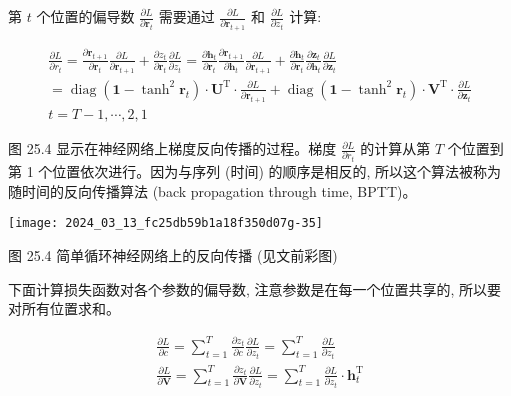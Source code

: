 \documentclass[10pt]{article}
\begin{document}
第 $t$ 个位置的偏导数 $\frac{\partial L}{\partial \boldsymbol{r}_{t}}$ 需要通过 $\frac{\partial L}{\partial \boldsymbol{r}_{t+1}}$ 和 $\frac{\partial L}{\partial z_{t}}$ 计算:


\begin{gather*}
\frac{\partial L}{\partial r_{t}}=\frac{\partial \boldsymbol{r}_{t+1}}{\partial \boldsymbol{r}_{t}} \frac{\partial L}{\partial \boldsymbol{r}_{t+1}}+\frac{\partial z_{t}}{\partial \boldsymbol{r}_{t}} \frac{\partial L}{\partial z_{t}}=\frac{\partial \boldsymbol{h}_{t}}{\partial \boldsymbol{r}_{t}} \frac{\partial \boldsymbol{r}_{t+1}}{\partial \boldsymbol{h}_{t}} \frac{\partial L}{\partial \boldsymbol{r}_{t+1}}+\frac{\partial \boldsymbol{h}_{t}}{\partial \boldsymbol{r}_{t}} \frac{\partial \boldsymbol{z}_{t}}{\partial \boldsymbol{h}_{t}} \frac{\partial L}{\partial \boldsymbol{z}_{t}} \\
=\operatorname{diag}\left(\boldsymbol{1}-\tanh ^{2} \boldsymbol{r}_{t}\right) \cdot \boldsymbol{U}^{\mathrm{T}} \cdot \frac{\partial L}{\partial \boldsymbol{r}_{t+1}}+\operatorname{diag}\left(\boldsymbol{1}-\tanh ^{2} \boldsymbol{r}_{t}\right) \cdot \boldsymbol{V}^{\mathrm{T}} \cdot \frac{\partial L}{\partial \boldsymbol{z}_{t}} \\
t=T-1, \cdots, 2,1 \tag{25.13}
\end{gather*}


图 25.4 显示在神经网络上梯度反向传播的过程。梯度 $\frac{\partial L}{\partial r_{t}}$ 的计算从第 $T$ 个位置到第 1 个位置依次进行。因为与序列 (时间) 的顺序是相反的, 所以这个算法被称为随时间的反向传播算法 (back propagation through time, BPTT)。

\begin{center}
\texttt{[image: 2024\_03\_13\_fc25db59b1a18f350d07g-35]}
\end{center}

图 25.4 简单循环神经网络上的反向传播 (见文前彩图)

下面计算损失函数对各个参数的偏导数, 注意参数是在每一个位置共享的, 所以要对所有位置求和。


\begin{gather*}
\frac{\partial L}{\partial c}=\sum_{t=1}^{T} \frac{\partial z_{t}}{\partial c} \frac{\partial L}{\partial z_{t}}=\sum_{t=1}^{T} \frac{\partial L}{\partial z_{t}}  \tag{25.14}\\
\frac{\partial L}{\partial \boldsymbol{V}}=\sum_{t=1}^{T} \frac{\partial z_{t}}{\partial \boldsymbol{V}} \frac{\partial L}{\partial z_{t}}=\sum_{t=1}^{T} \frac{\partial L}{\partial z_{t}} \cdot \boldsymbol{h}_{t}^{\mathrm{T}} \tag{25.15}
\end{gather*}
\end{document}

